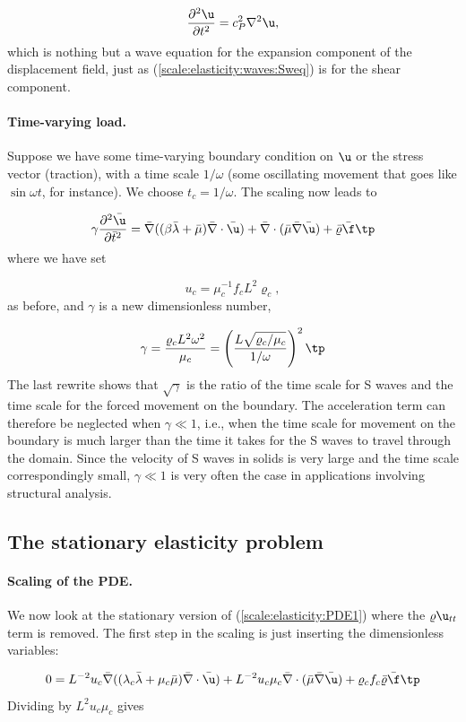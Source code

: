 \documentclass[graybox,envcountchap,sectrefs,final]{svmonodo}
\begin{document}
\[ \frac{\partial^2\u}{\partial t^2} = c_P^2\nabla^2\u,\]
\label{scale:elasticity:waves:Pweq}
which is nothing but a wave equation for the expansion component of the
displacement field, just as (\ref{scale:elasticity:waves:Sweq}) is for the
shear component.


\paragraph{Time-varying load.}
Suppose we have some time-varying boundary condition on $\u$ or the
stress vector (traction), with a time scale $1/\omega$ (some
oscillating movement that goes like $\sin\omega t$, for instance). We
choose $t_c=1/\omega$.  The scaling now leads to

\[
\gamma
\frac{\partial^2\bar \u}{\partial \bar t^2} =
\bar \nabla ((\beta\bar\lambda +
\bar\mu)\bar \nabla\cdot\bar \u) +
\bar \nabla\cdot(\bar \mu\bar \nabla\bar \u) +
\bar\varrho\bar\f\tp
\]
where we have set

\[ u_c = \mu_c^{-1}f_cL^2\varrho_c,\]
as before, and $\gamma$ is a new dimensionless number,

\[ \gamma = \frac{\varrho_cL^2 \omega^2}{\mu_c} =
\left(\frac{L\sqrt{\varrho_c/\mu_c}}{1/\omega}\right)^2\tp\]
The last rewrite shows that $\sqrt{\gamma}$ is the ratio of
the time scale for S waves and the time scale for the forced
movement on the boundary. The acceleration term can therefore
be neglected when $\gamma\ll 1$, i.e., when the time scale
for movement on the boundary is much larger than the time it
takes for the S waves to travel through the domain.
Since the velocity of S waves in solids is very large and
the time scale correspondingly small, $\gamma\ll 1$
is very often the case in applications involving structural analysis.


\subsection{The stationary elasticity problem}
\label{scale:elasticity:stationary}

\paragraph{Scaling of the PDE.}
We now look at the stationary version of
(\ref{scale:elasticity:PDE1}) where the $\varrho\u_{tt}$ term is
removed. The first step in the scaling is just inserting the
dimensionless variables:

\[
0 =
L^{-2}u_c\bar \nabla ((\lambda_c\bar\lambda +
\mu_c\bar\mu)\bar \nabla\cdot\bar \u) +
L^{-2}u_c\mu_c\bar \nabla\cdot(\bar \mu\bar \nabla\bar \u) +
\varrho_cf_c\bar\varrho\bar\f\tp
\]
Dividing by $L^2u_c\mu_c$ gives
\end{document}
